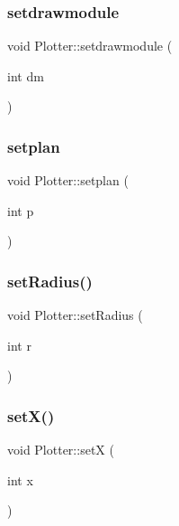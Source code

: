 \mbox{\label{class_plotter_a6f80702bdfaef06fc3c127bcf2e92b45}} 
\subsubsection{\texorpdfstring{setdrawmodule}{setdrawmodule}}
{\footnotesize\ttfamily void Plotter\+::setdrawmodule (\begin{DoxyParamCaption}\item[{int}]{dm }\end{DoxyParamCaption})\hspace{0.3cm}{\ttfamily [slot]}}

\mbox{\label{class_plotter_aa2706e1b6da1cdde9c5dcfcf001215c1}} 
\subsubsection{\texorpdfstring{setplan}{setplan}}
{\footnotesize\ttfamily void Plotter\+::setplan (\begin{DoxyParamCaption}\item[{int}]{p }\end{DoxyParamCaption})\hspace{0.3cm}{\ttfamily [slot]}}

\mbox{\label{class_plotter_a7f39ba0215921d27437d96d56935429a}} 
\subsubsection{\texorpdfstring{set\+Radius()}{setRadius()}}
{\footnotesize\ttfamily void Plotter\+::set\+Radius (\begin{DoxyParamCaption}\item[{int}]{r }\end{DoxyParamCaption})}

\mbox{\label{class_plotter_a57dcb319c1d0ce82bc45d3dba2ece38e}} 
\subsubsection{\texorpdfstring{set\+X()}{setX()}}
{\footnotesize\ttfamily void Plotter\+::setX (\begin{DoxyParamCaption}\item[{int}]{x }\end{DoxyParamCaption})}

